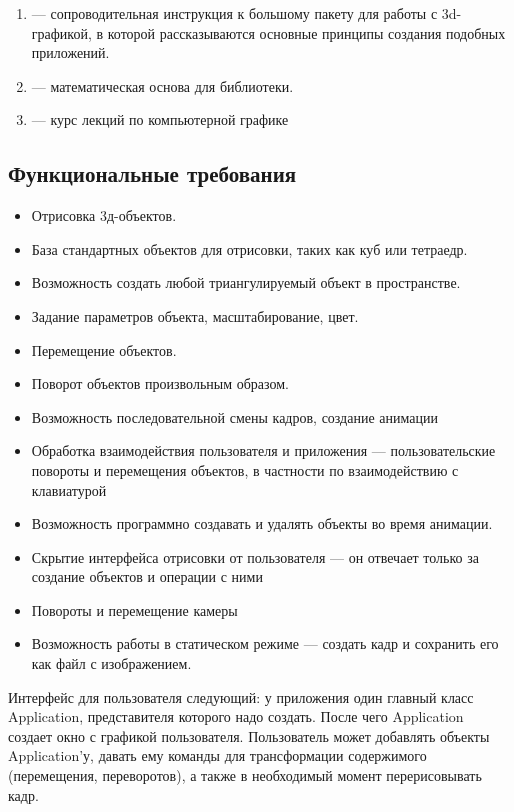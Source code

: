 \documentclass{article}
\begin{document}
\begin{enumerate}
\item \cite{vtkBook} --- сопроводительная инструкция к большому пакету для работы с 3d-графикой, в которой рассказываются основные принципы создания подобных приложений.
\item \cite{Math3d} --- математическая основа для библиотеки.
\item \cite{urtech}--- курс лекций по компьютерной графике
\end{enumerate}

\subsection{Функциональные требования}

\begin{itemize}
\item Отрисовка 3д-объектов.
\item База стандартных объектов для отрисовки, таких как куб или тетраедр.
\item Возможность создать любой триангулируемый объект в пространстве.
\item Задание параметров объекта, масштабирование, цвет.
\item Перемещение объектов.
\item Поворот объектов произвольным образом.
\item Возможность последовательной смены кадров, создание анимации
\item Обработка взаимодействия пользователя и приложения — пользовательские повороты и перемещения объектов, в частности по взаимодействию с клавиатурой
\item Возможность программно создавать и удалять объекты во время анимации.
\item Скрытие интерфейса отрисовки от пользователя — он отвечает только за создание объектов и операции с ними
\item Повороты и перемещение камеры
\item Возможность работы в статическом режиме — создать кадр и сохранить его как файл с изображением.
\end{itemize}

Интерфейс для пользователя следующий: у приложения один главный класс Application, представителя которого надо создать. После чего Application создает окно с графикой пользователя. Пользователь может добавлять объекты Application'у, давать ему команды для трансформации содержимого (перемещения, переворотов), а также в необходимый момент перерисовывать кадр.
\end{document}
